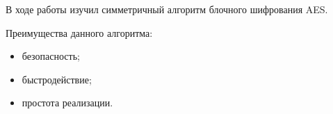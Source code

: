 \documentclass[utf8x, 14pt, bold, times]{G7-32} %
\begin{document}
\inputminted[fontsize=\footnotesize, breaklines]{cpp}{../../src/main.cpp}

\backmatter %

\newpage
\Conclusion

В ходе работы изучил симметричный алгоритм блочного шифрования AES.

Преимущества данного алгоритма:

\begin{itemize}
\item безопасность;
\item быстродействие;
\item простота реализации.
\end{itemize}
\end{document}
